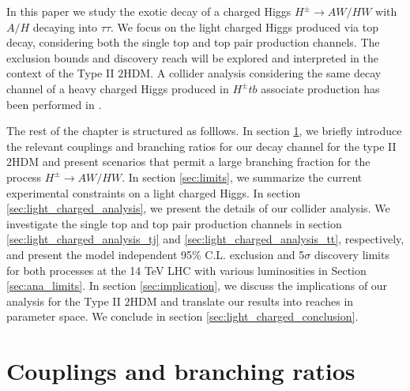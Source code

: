 In this paper we study the exotic decay of a charged Higgs $H^\pm\to AW/HW$  with $A/H$ decaying into  $\tau\tau$.  We focus on the light charged Higgs  produced via top decay, considering both the single top and top pair production channels. The exclusion bounds and discovery reach will be explored and interpreted in the context of the Type II $2$HDM.  A collider analysis considering the same decay channel of a heavy charged Higgs   produced in $H^\pm tb$ associate production has been performed in \cite{Coleppa:2014cca}.  

The rest of the chapter is structured as folllows. In section \ref{sec:motivation}, we briefly introduce the relevant couplings and branching ratios for our decay channel for the type II $2$HDM and present scenarios that permit a large branching fraction for the process $H^{\pm} \rightarrow AW/HW$. In section \ref{sec:limits}, we summarize the current experimental constraints on a light charged Higgs. In section \ref{sec:light_charged_analysis}, we present the details of our collider analysis. We investigate the single top and top pair production channels in section \ref{sec:light_charged_analysis_tj} and \ref{sec:light_charged_analysis_tt}, respectively, and present the model independent 95\% C.L. exclusion and 5$\sigma$ discovery limits for both processes at the 14 TeV LHC with various luminosities in Section \ref{sec:ana_limits}. In section \ref{sec:implication}, we discuss the implications of our analysis for the Type II $2$HDM and translate our results into reaches in parameter space. We conclude in section \ref{sec:light_charged_conclusion}.
 
\section{Couplings and branching ratios} \label{sec:motivation}

